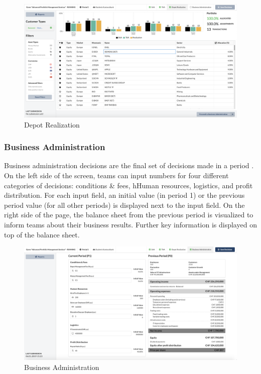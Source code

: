 \begin{figure}[h!]
  \centering
  \includegraphics[scale=0.2]{img/application-overview/teams/05_depot_realization.png}
  \caption{Depot Realization}
  \label{fig:depot_realization}
\end{figure}

\subsubsection{Business Administration}
Business administration decisions are the final set of decisions made in a period . On the left side of the screen, teams can input numbers for four different categories of decisions: conditions \& fees, hHuman resources, logistics, and profit distribution. For each input field, an initial value (in period 1) or the previous period value (for all other periods) is displayed next to the input field. On the right side of the page, the balance sheet from the previous period is visualized to inform teams about their business results. Further key information is displayed on top of the balance sheet.
\begin{figure}[h!]
  \centering
  \includegraphics[scale=0.2]{img/application-overview/teams/06_business.png}
  \caption{Business Administration}
  \label{fig:business_admin}
\end{figure}


